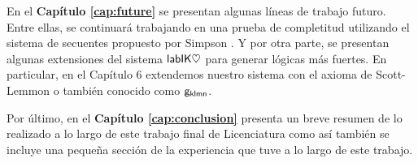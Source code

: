 En el \textbf{Capítulo \ref{cap:future}} se presentan algunas líneas de trabajo futuro. Entre ellas, se continuará trabajando en una prueba de completitud utilizando el sistema de secuentes propuesto por Simpson \cite{simpson1994}. Y por otra parte, se presentan algunas extensiones del sistema $\mathsf{labIK\heartsuit}$ para generar lógicas más fuertes. En particular, en el Capítulo 6 extendemos nuestro sistema con el axioma de Scott-Lemmon o también conocido como $\mathsf{g_{klmn}}$.

Por último, en el \textbf{Capítulo \ref{cap:conclusion}} presenta un breve resumen de lo realizado a lo largo de este trabajo final de Licenciatura como así también se incluye una pequeña sección de la experiencia que tuve a lo largo de este trabajo.